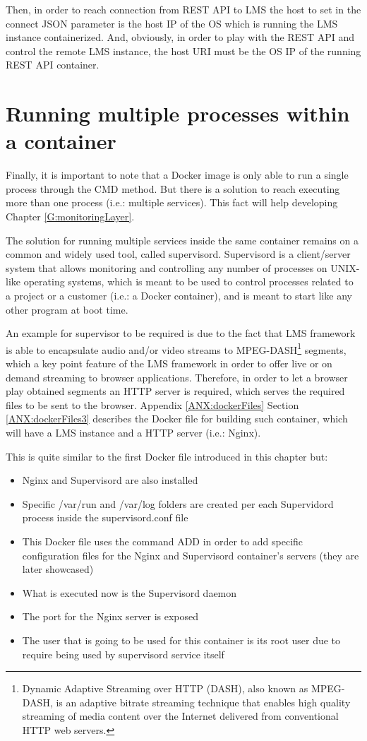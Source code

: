 Then, in order to reach connection from REST API to LMS the host to set in the connect JSON parameter is the host IP of the OS which is running the LMS instance containerized. And, obviously, in order to play with the REST API and control the remote LMS instance, the host URI must be the OS IP of the running REST API container.

\section{Running multiple processes within a container}

Finally, it is important to note that a Docker image is only able to run a single process through the CMD method. But there is a solution to reach executing more than one process (i.e.: multiple services). This fact will help developing Chapter \ref{G:monitoringLayer}.

The solution for running multiple services inside the same container remains on a common and widely used tool, called supervisord. Supervisord is a client/server system that allows monitoring and controlling any number of processes on UNIX-like operating systems, which is meant to be used to control processes related to a project or a customer (i.e.: a Docker container), and is meant to start like any other program at boot time.

An example for supervisor to be required is due to the fact that LMS framework is able to encapsulate audio and/or video streams to MPEG-DASH\footnote{Dynamic Adaptive Streaming over HTTP (DASH), also known as MPEG-DASH, is an adaptive bitrate streaming technique that enables high quality streaming of media content over the Internet delivered from conventional HTTP web servers.} \cite{mpegdash} segments, which a key point feature of the LMS framework in order to offer live or on demand streaming to browser applications. Therefore, in order to let a browser play obtained segments an HTTP server is required, which serves the required files to be sent to the browser. Appendix \ref{ANX:dockerFiles} Section \ref{ANX:dockerFiles3} describes the Docker file for building such container, which will have a LMS instance and a HTTP server (i.e.: Nginx).

This is quite similar to the first Docker file introduced in this chapter but:

\begin{itemize}
\item Nginx and Supervisord are also installed
\item Specific /var/run and /var/log folders are created per each Supervidord process inside the supervisord.conf file
\item This Docker file uses the command ADD in order to add specific configuration files for the Nginx and Supervisord container's servers (they are later showcased)
\item What is executed now is the Supervisord daemon
\item The port for the Nginx server is exposed
\item The user that is going to be used for this container is its root user due to require being used by supervisord service itself
\end{itemize}


